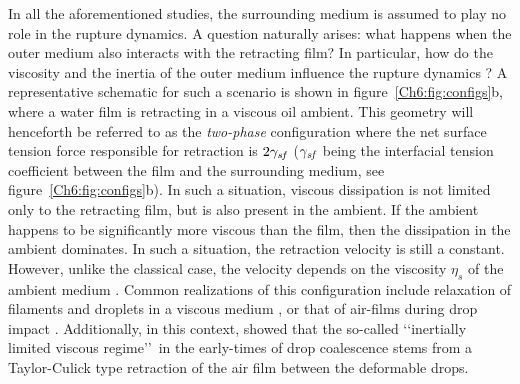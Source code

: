 In all the aforementioned studies, the surrounding medium is assumed to play no role in the rupture dynamics. A question naturally arises: what happens when the outer medium also interacts with the retracting film? In particular, how do the viscosity and the inertia of the outer medium influence the rupture dynamics \citep{mysels-1973-jphyschem, joanny-1987-physicaa, reyssat-2006-epl, jian_deng_thoraval_2020}? A representative schematic for such a scenario is shown in figure~\ref{Ch6:fig:configs}b, where a water film is retracting in a viscous oil ambient. This geometry will henceforth be referred to as the \emph{two-phase} configuration where the net surface tension force responsible for retraction is $2\gamma_\mathit{sf}$ ($\gamma_\mathit{sf}$ being the interfacial tension coefficient between the film and the surrounding medium, see figure~\ref{Ch6:fig:configs}b). In such a situation, viscous dissipation is not limited only to the retracting film, but is also present in the ambient. If the ambient happens to be significantly more viscous than the film, then the dissipation in the ambient dominates. In such a situation, the retraction velocity is still a constant. However, unlike the classical case, the velocity depends on the viscosity $\eta_{s}$ of the ambient medium \citep{martin-1994-epl, reyssat-2006-epl}. Common realizations of this configuration include relaxation of filaments and droplets in a viscous medium \citep{stone1989relaxation}, or that of air-films during drop impact \citep{jian2020split, jian_deng_thoraval_2020}. Additionally, in this context, \cite{anthony2020initial} showed that the so-called \lq\lq inertially limited viscous regime\rq\rq\, in the early-times of drop coalescence \citep{paulsen-2012-pnas, paulsen2013approach} stems from a Taylor-Culick type retraction of the air film between the deformable drops.

